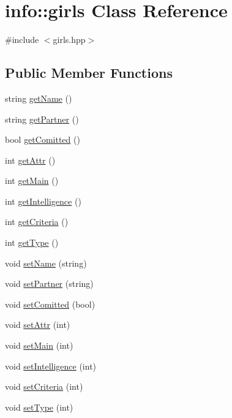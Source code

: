 \hypertarget{classinfo_1_1girls}{}\section{info\+:\+:girls Class Reference}
\label{classinfo_1_1girls}


{\ttfamily \#include $<$girls.\+hpp$>$}

\subsection*{Public Member Functions}
\begin{DoxyCompactItemize}
\item 
string \hyperlink{classinfo_1_1girls_a59d067b6a5aef8ca689421946e43f7f1}{get\+Name} ()
\item 
string \hyperlink{classinfo_1_1girls_a66cf0fbd2800d4f4e85b4d202a8e38fa}{get\+Partner} ()
\item 
bool \hyperlink{classinfo_1_1girls_a1795204bb337a0b3a826ec9f91d3205d}{get\+Comitted} ()
\item 
int \hyperlink{classinfo_1_1girls_a19bf094e16a60b155e8118c29423ec40}{get\+Attr} ()
\item 
int \hyperlink{classinfo_1_1girls_a896b6dad9a68d86401f89f45dcc7681f}{get\+Main} ()
\item 
int \hyperlink{classinfo_1_1girls_aae67a97573bec8c280751bd7c86fb483}{get\+Intelligence} ()
\item 
int \hyperlink{classinfo_1_1girls_a78976da9f0a609c6ec2b72627dfde05a}{get\+Criteria} ()
\item 
int \hyperlink{classinfo_1_1girls_ac0bfb33bd7a8c5bae0de870f2f902679}{get\+Type} ()
\item 
void \hyperlink{classinfo_1_1girls_abc77ee8f690ab491ec18fb7b0dd3bc78}{set\+Name} (string)
\item 
void \hyperlink{classinfo_1_1girls_a56e12cb4114d37e4f018e804d2b96fb5}{set\+Partner} (string)
\item 
void \hyperlink{classinfo_1_1girls_a1edd7969e0524944ce112e1a90acca77}{set\+Comitted} (bool)
\item 
void \hyperlink{classinfo_1_1girls_aa51ce4be0277be724e6d150e66b47f27}{set\+Attr} (int)
\item 
void \hyperlink{classinfo_1_1girls_a7f3a9a02c666105d74678d5a2d3d83c3}{set\+Main} (int)
\item 
void \hyperlink{classinfo_1_1girls_ad48c94e0936348f942ec7e429a7611eb}{set\+Intelligence} (int)
\item 
void \hyperlink{classinfo_1_1girls_a012db02589fb678cc14094539be4114b}{set\+Criteria} (int)
\item 
void \hyperlink{classinfo_1_1girls_ae8e16413f0ed3dca0c37bbcb3970d544}{set\+Type} (int)
\end{DoxyCompactItemize}
